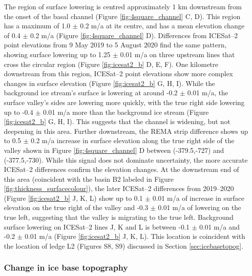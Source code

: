 \newpage
The region of surface lowering is centred  approximately 1 km downstream from the onset of the basal channel (Figure \ref{fig:4square_channel} C, D). This region has a maximum of 1.0 $\pm$ 0.2 m/a at its centre, and has a mean elevation change of 0.4 $\pm$ 0.2 m/a (Figure \ref{fig:4square_channel} D).  Differences from ICESat--2 point elevations from 9 May 2019 to 5 August 2020 find the same pattern, showing surface lowering up to 1.25 $\pm$ 0.01 m/a on three upstream lines that cross the circular region (Figure \ref{fig:icesat2_b} D, E, F). 
One kilometre downstream from this region, ICESat--2 point elevations show more complex changes in surface elevation (Figure \ref{fig:icesat2_b} G, H, I). While the background ice stream's surface is lowering at around -0.2 $\pm$ 0.01 m/a, the surface valley's sides are lowering more quickly, with the true right side  lowering up to -0.4 $\pm$ 0.01 m/a more than the background ice stream (Figure \ref{fig:icesat2_b} G, H, I).  This suggests that the channel is widening, but not deepening in this area.
Further downstream, the REMA strip difference shows up to 0.5 $\pm$ 0.2 m/a increase in surface elevation along the true right side of the valley shown in Figure \ref{fig:4square_channel} D between (-379.5,-727) and (-377.5,-730). While this signal does not dominate uncertainty, the more accurate ICESat--2 differences confirm the elevation changes.  At the downstream end of this area (coincident with the basin B2 labeled in Figure \ref{fig:thickness_surfacecolour}), the later ICESat--2 differences from 2019--2020 (Figure \ref{fig:icesat2_b} J, K, L) show up to 0.1 $\pm$ 0.01  m/a of increase in surface elevation on the true right of the valley and -0.3 $\pm$ 0.01 m/a of lowering on the true left, suggesting that the valley is migrating to the true left. Background surface lowering on ICESat--2 lines J, K and L is between -0.1 $\pm$ 0.01 m/a and -0.2 $\pm$ 0.01 m/a (Figure \ref{fig:icesat2_b} J, K, L). This location is coincident with the location of ledge L2 (Figures S8, S9) discussed in Section \ref{sec:icebasetopog}. 
 

\subsubsection{Change in ice base topography} \label{sec:changeinbase}


